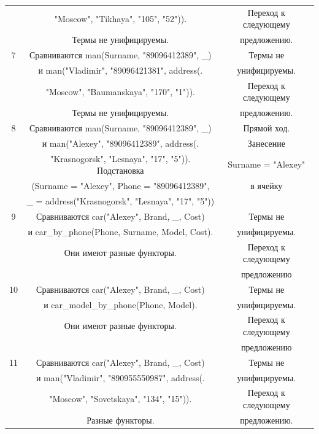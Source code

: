 \documentclass[12pt]{report}
\begin{document}
\begin{table}[H]
\begin{center}
\begin{tabular}{|c c c |}
			& "Moscow"{}, "Tikhaya"{}, "105"{}, "52"{})).  & Переход к следующему \\
			& Термы не унифицируемы. & предложению. \\
			\hline
			7 & Сравниваются man(Surname, "89096412389"{}, \_) & Термы не \\
			& и man("Vladimir"{}, "89096421381"{}, address(. & унифицируемы. \\
			& "Moscow"{}, "Baumanskaya"{}, "170"{}, "1"{})).  & Переход к следующему \\
			& Термы не унифицируемы. & предложению. \\
			\hline
			8 & Сравниваются man(Surname, "89096412389"{}, \_) & Прямой ход. \\
			& и man("Alexey"{}, "89096412389"{}, address(. & Занесение \\
			& "Krasnogorsk"{}, "Lesnaya"{}, "17"{}, "5"{})). Подстановка & Surname = "Alexey"{} \\
			& (Surname = "Alexey", Phone = "89096412389"{}, & в ячейку\\
			& \_ = address("Krasnogorsk"{}, "Lesnaya"{}, "17"{}, "5"{})) &\\
			\hline
			9 & Сравниваются car("Alexey"{}, Brand, \_, Cost) & Термы не \\
			& и car\_by\_phone(Phone, Surname, Model, Cost). & унифицируемы. \\
			& Они имеют разные функторы. &Переход к следующему \\
			& & предложению\\
			\hline
			10 & Сравниваются car("Alexey"{}, Brand, \_, Cost) & Термы не \\
			& и car\_model\_by\_phone(Phone, Model). & унифицируемы. \\
			& Они имеют разные функторы. &Переход к следующему \\
			& & предложению\\
			\hline
			11 & Сравниваются car("Alexey"{}, Brand, \_, Cost) & Термы не \\
			& и man("Vladimir"{}, "890955550987"{}, address(. & унифицируемы. \\
			& "Moscow"{}, "Sovetskaya"{}, "134"{}, "15"{})).  & Переход к следующему \\
			& Разные функторы. & предложению. \\
			\hline
		\end{tabular}
	\end{center}
\end{table}
\end{document}
